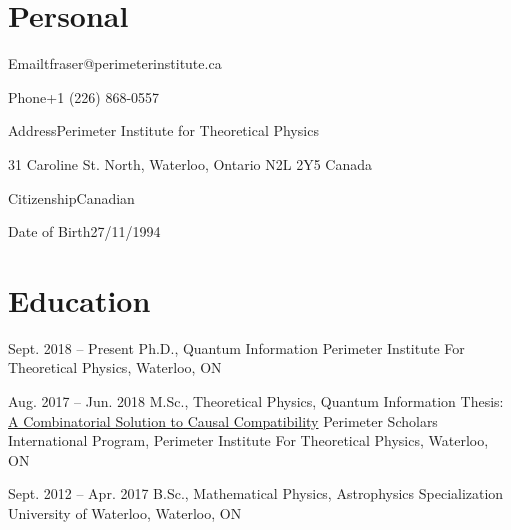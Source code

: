 \documentclass[10pt]{article}
\begin{document}
    \vspace{1em}
    \section{Personal}
    \begin{personallist}
        \item{Email}{tfraser@perimeterinstitute.ca}
        \item{Phone}{+1 (226) 868-0557}
        \item{Address}{Perimeter Institute for Theoretical Physics}
        \item{}{31 Caroline St. North, Waterloo, Ontario N2L 2Y5 Canada}
        \item{Citizenship}{Canadian}
        \item{Date of Birth}{27/11/1994}
    \end{personallist}
    \section{Education}
    \begin{educationlist}
        \item{Sept. 2018 -- Present}
            {Ph.D., Quantum Information}
            {}
            {Perimeter Institute For Theoretical Physics, Waterloo, ON}
        \item{Aug. 2017 -- Jun. 2018}
            {M.Sc., Theoretical Physics, Quantum Information}
            {Thesis: \href{https://www.degruyter.com/document/doi/10.1515/jci-2019-0013/html?lang=en}{A Combinatorial Solution to Causal Compatibility}}
            {Perimeter Scholars International Program, Perimeter Institute For Theoretical Physics, Waterloo, ON}
        \item{Sept. 2012 -- Apr. 2017}
            {B.Sc., Mathematical Physics, Astrophysics Specialization}
            {}
            {University of Waterloo, Waterloo, ON}
    \end{educationlist}
\end{document}

